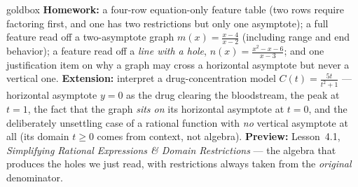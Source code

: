 \documentclass[10pt]{article}
\begin{document}
\begin{skillbox}{goldbox}
\textbf{Homework:} a four-row equation-only feature table (two rows require factoring first, and one
has two restrictions but only one asymptote); a full feature read off a two-asymptote graph
$m(x)=\frac{x-4}{x-2}$ (including range and end behavior); a feature read off a \emph{line with a
hole}, $n(x)=\frac{x^2-x-6}{x-3}$; and one justification item on why a graph may cross a horizontal
asymptote but never a vertical one. \textbf{Extension:} interpret a drug-concentration model
$C(t)=\frac{5t}{t^2+1}$ --- horizontal asymptote $y=0$ as the drug clearing the bloodstream, the peak
at $t=1$, the fact that the graph \emph{sits on} its horizontal asymptote at $t=0$, and the
deliberately unsettling case of a rational function with \emph{no} vertical asymptote at all (its
domain $t\ge0$ comes from context, not algebra). \textbf{Preview:} Lesson~4.1, \emph{Simplifying
Rational Expressions \& Domain Restrictions} --- the algebra that produces the holes we just read, with
restrictions always taken from the \emph{original} denominator.
\end{skillbox}
\end{document}
